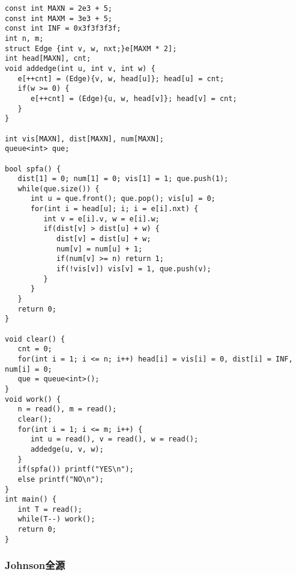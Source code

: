 \documentclass{article}
\begin{document}
\begin{lstlisting}
const int MAXN = 2e3 + 5;
const int MAXM = 3e3 + 5;
const int INF = 0x3f3f3f3f;
int n, m;
struct Edge {int v, w, nxt;}e[MAXM * 2];
int head[MAXN], cnt;
void addedge(int u, int v, int w) {
   e[++cnt] = (Edge){v, w, head[u]}; head[u] = cnt;
   if(w >= 0) {
      e[++cnt] = (Edge){u, w, head[v]}; head[v] = cnt;
   }
}

int vis[MAXN], dist[MAXN], num[MAXN];
queue<int> que;

bool spfa() {
   dist[1] = 0; num[1] = 0; vis[1] = 1; que.push(1);
   while(que.size()) {
      int u = que.front(); que.pop(); vis[u] = 0;
      for(int i = head[u]; i; i = e[i].nxt) {
         int v = e[i].v, w = e[i].w; 
         if(dist[v] > dist[u] + w) {
            dist[v] = dist[u] + w;
            num[v] = num[u] + 1;
            if(num[v] >= n) return 1;
            if(!vis[v]) vis[v] = 1, que.push(v);
         }
      }
   }
   return 0;
}

void clear() {
   cnt = 0;
   for(int i = 1; i <= n; i++) head[i] = vis[i] = 0, dist[i] = INF, num[i] = 0;
   que = queue<int>();
}
void work() {
   n = read(), m = read();
   clear();
   for(int i = 1; i <= m; i++) {
      int u = read(), v = read(), w = read();
      addedge(u, v, w);
   }
   if(spfa()) printf("YES\n");
   else printf("NO\n");
}
int main() {
   int T = read();
   while(T--) work();
   return 0;
}
\end{lstlisting}

    \subsubsection{Johnson全源}
    
\end{document}
